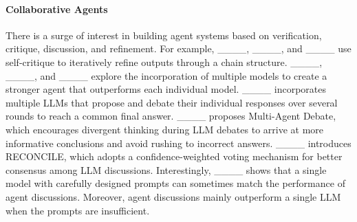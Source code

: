 \paragraph{Collaborative Agents} There is a surge of interest in building agent systems based on verification, critique, discussion, and refinement. For example, ____, ____, and ____ use self-critique to iteratively refine outputs through a chain structure. ____, ____, and ____ explore the incorporation of multiple models to create a stronger agent that outperforms each individual model. ____ incorporates multiple LLMs that propose and debate their individual responses over several rounds to reach a common final answer. ____ proposes Multi-Agent Debate, which encourages divergent thinking during LLM debates to arrive at more informative conclusions and avoid rushing to incorrect answers. ____ introduces RECONCILE, which adopts a confidence-weighted voting mechanism for better consensus among LLM discussions. Interestingly, ____ shows that a single model with carefully designed prompts can sometimes match the performance of agent discussions. Moreover, agent discussions mainly outperform a single LLM when the prompts are insufficient.